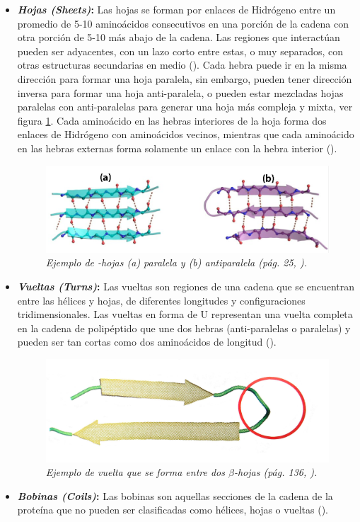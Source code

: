 \begin{itemize}
	
	\item \textbf{\textit{Hojas (Sheets)}:} Las hojas se forman por enlaces de Hidrógeno entre un promedio de 5-10 aminoácidos consecutivos en una porción de la cadena con otra porción de 5-10 más abajo de la cadena. Las regiones que interactúan pueden ser adyacentes, con un lazo corto entre estas, o muy separados, con otras estructuras secundarias en  medio (\citealp{lehninger}). Cada hebra puede ir en la misma dirección para formar una hoja paralela, sin embargo, pueden tener dirección inversa para formar una hoja anti-paralela, o pueden estar mezcladas hojas paralelas con anti-paralelas para generar una hoja más compleja y mixta, ver figura \ref{fig:beta-sheets}. Cada aminoácido en las hebras interiores de la hoja forma dos enlaces de Hidrógeno con aminoácidos vecinos, mientras que cada aminoácido en las hebras externas forma solamente un enlace con la hebra interior (\citealp{molecular:book}).
	
	\begin{figure}[H]
		\centering
		\includegraphics[scale=0.45]{images/beta.png}
		\caption{\em Ejemplo de \textbeta-hojas (a) paralela y (b) antiparalela (pág. 25, \citealp{bioinfopt}).}
		\label{fig:beta-sheets}
	\end{figure}

	\item \textbf{\textit{Vueltas (Turns)}:} Las vueltas son regiones de una cadena que se encuentran entre las hélices y hojas, de diferentes longitudes y configuraciones tridimensionales. Las vueltas en forma de U representan una vuelta completa en la cadena de polipéptido que une dos hebras (anti-paralelas o paralelas) y pueden ser tan cortas como dos aminoácidos de longitud (\citealp{molecular:book}).
	\begin{figure}[H]
		\centering
		\includegraphics[scale=.8]{images/turn.png}
		\caption{\em Ejemplo de vuelta que se forma entre dos $\beta$-hojas (pág. 136, \citealp{book:kessel}).}
		\label{fig:turns}
	\end{figure}
	
	\item \textbf{\textit{Bobinas (Coils)}:} Las bobinas son aquellas secciones de la cadena de la proteína que no pueden ser clasificadas como hélices, hojas o vueltas (\citealp{molecular:book}).
\end{itemize}

